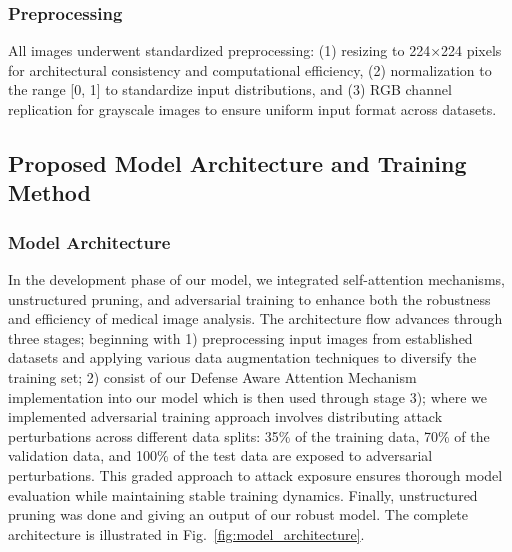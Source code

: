\documentclass[preprint,12pt]{elsarticle}
\begin{document}
\subsubsection{Preprocessing}
All images underwent standardized preprocessing: (1) resizing to 224×224 pixels for architectural consistency and computational efficiency, (2) normalization to the range [0, 1] to standardize input distributions, and (3) RGB channel replication for grayscale images to ensure uniform input format across datasets.

\subsection{Proposed Model Architecture and Training Method}

\subsubsection{Model Architecture}
In the development phase of our model, we integrated self-attention mechanisms, unstructured pruning, and adversarial training to enhance both the robustness and efficiency of medical image analysis. The architecture flow advances through three stages; beginning with 1) preprocessing input images from established datasets and applying various data augmentation techniques to diversify the training set; 2) consist of our Defense Aware Attention Mechanism implementation into our model which is then used through stage 3); where we implemented adversarial training approach involves distributing attack perturbations across different data splits: 35\% of the training data, 70\% of the validation data, and 100\% of the test data are exposed to adversarial perturbations. This graded approach to attack exposure ensures thorough model evaluation while maintaining stable training dynamics. Finally, unstructured pruning was done and giving an output of our robust model. The complete architecture is illustrated in Fig.~\ref{fig:model_architecture}.
\end{document}

